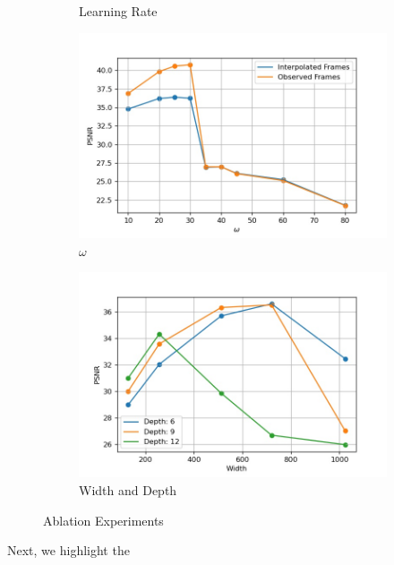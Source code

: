 \documentclass{article}
\begin{document}
\begin{figure}
\begin{subfigure}{0.6\textwidth}
	\caption{Learning Rate}
\end{subfigure}
\begin{subfigure}{0.5\textwidth}
\centering    
    \includegraphics[width=1\linewidth]{omega.jpg}
    \caption{$\omega$}
\end{subfigure}%
\begin{subfigure}{0.6\textwidth}
\centering   
    \includegraphics[width=1\linewidth]{Width_Depth.jpg}
    \caption{Width and Depth}
\end{subfigure}
\caption{Ablation Experiments}
\end{figure}





Next, we highlight the
\end{document}
